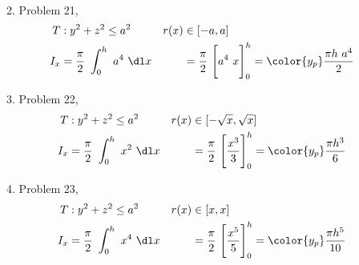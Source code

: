 \begin{enumerate}
\begin{enumerate}
\begin{align}
                    \end{align}
              \item Problem 21,
                    \begin{align}
                        T       & : y^2 + z^2 \leq a^2                          &
                        r(x)    & \in [-a, a]                                     \\
                        I_x     & = \frac{\pi}{2}\ \int_{0}^{h}\ a^4
                        \ \dl x &
                                & = \frac{\pi}{2}\ \Bigg[ a^4\ x \Bigg]_{0}^{h}
                        = \color{y_p} \frac{\pi h\ a^4}{2}
                    \end{align}
              \item Problem 22,
                    \begin{align}
                        T       & : y^2 + z^2 \leq a^2                  &
                        r(x)    & \in [-\sqrt{x}, \sqrt{x}]               \\
                        I_x     & = \frac{\pi}{2}\ \int_{0}^{h}\ x^2
                        \ \dl x &
                                & = \frac{\pi}{2}\ \Bigg[ \frac{x^3}{3}
                            \Bigg]_{0}^{h}
                        = \color{y_p} \frac{\pi h^3}{6}
                    \end{align}
              \item Problem 23,
                    \begin{align}
                        T       & : y^2 + z^2 \leq a^2                  &
                        r(x)    & \in [x, x]                              \\
                        I_x     & = \frac{\pi}{2}\ \int_{0}^{h}\ x^4
                        \ \dl x &
                                & = \frac{\pi}{2}\ \Bigg[ \frac{x^5}{5}
                            \Bigg]_{0}^{h}
                        = \color{y_p} \frac{\pi h^5}{10}
                    \end{align}
          \end{enumerate}


\end{enumerate}